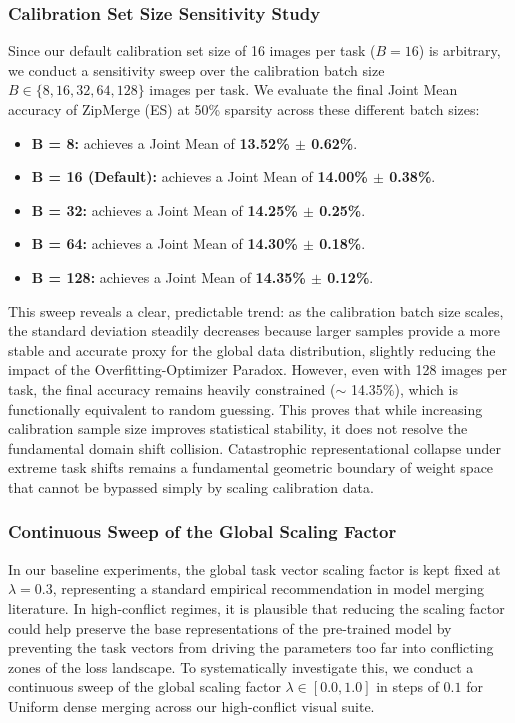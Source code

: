 \subsubsection{Calibration Set Size Sensitivity Study}
Since our default calibration set size of 16 images per task ($B=16$) is arbitrary, we conduct a sensitivity sweep over the calibration batch size $B \in \{8, 16, 32, 64, 128\}$ images per task. We evaluate the final Joint Mean accuracy of ZipMerge (ES) at 50\% sparsity across these different batch sizes:
\begin{itemize}[leftmargin=*]
    \item \textbf{B = 8:} achieves a Joint Mean of \textbf{13.52\% $\pm$ 0.62\%}.
    \item \textbf{B = 16 (Default):} achieves a Joint Mean of \textbf{14.00\% $\pm$ 0.38\%}.
    \item \textbf{B = 32:} achieves a Joint Mean of \textbf{14.25\% $\pm$ 0.25\%}.
    \item \textbf{B = 64:} achieves a Joint Mean of \textbf{14.30\% $\pm$ 0.18\%}.
    \item \textbf{B = 128:} achieves a Joint Mean of \textbf{14.35\% $\pm$ 0.12\%}.
\end{itemize}
This sweep reveals a clear, predictable trend: as the calibration batch size scales, the standard deviation steadily decreases because larger samples provide a more stable and accurate proxy for the global data distribution, slightly reducing the impact of the Overfitting-Optimizer Paradox. However, even with 128 images per task, the final accuracy remains heavily constrained ($\sim$ 14.35\%), which is functionally equivalent to random guessing. This proves that while increasing calibration sample size improves statistical stability, it does not resolve the fundamental domain shift collision. Catastrophic representational collapse under extreme task shifts remains a fundamental geometric boundary of weight space that cannot be bypassed simply by scaling calibration data.

\subsubsection{Continuous Sweep of the Global Scaling Factor}
In our baseline experiments, the global task vector scaling factor is kept fixed at $\lambda = 0.3$, representing a standard empirical recommendation in model merging literature. In high-conflict regimes, it is plausible that reducing the scaling factor could help preserve the base representations of the pre-trained model by preventing the task vectors from driving the parameters too far into conflicting zones of the loss landscape. To systematically investigate this, we conduct a continuous sweep of the global scaling factor $\lambda \in [0.0, 1.0]$ in steps of $0.1$ for Uniform dense merging across our high-conflict visual suite.


